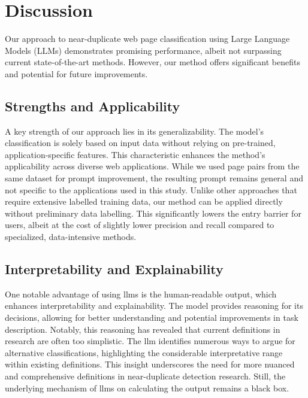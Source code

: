 \section{Discussion}

    Our approach to near-duplicate web page classification using Large Language Models (LLMs) demonstrates promising performance, albeit not surpassing current state-of-the-art methods. However, our method offers significant benefits and potential for future improvements.
    
    \subsection{Strengths and Applicability}
        A key strength of our approach lies in its generalizability. The model's classification is solely based on input data without relying on pre-trained, application-specific features. This characteristic enhances the method's applicability across diverse web applications. While we used page pairs from the same dataset for prompt improvement, the resulting prompt remains general and not specific to the applications used in this study.
        Unlike other approaches that require extensive labelled training data, our method can be applied directly without preliminary data labelling. This significantly lowers the entry barrier for users, albeit at the cost of slightly lower precision and recall compared to specialized, data-intensive methods.
        
    \subsection{Interpretability and Explainability}
        One notable advantage of using \acp{llm} is the human-readable output, which enhances interpretability and explainability. The model provides reasoning for its decisions, allowing for better understanding and potential improvements in task description.
        Notably, this reasoning has revealed that current definitions in research are often too simplistic. The \ac{llm} identifies numerous ways to argue for alternative classifications, highlighting the considerable interpretative range within existing definitions. This insight underscores the need for more nuanced and comprehensive definitions in near-duplicate detection research. Still, the underlying mechanism of \acp{llm} on calculating the output remains a black box.
        
